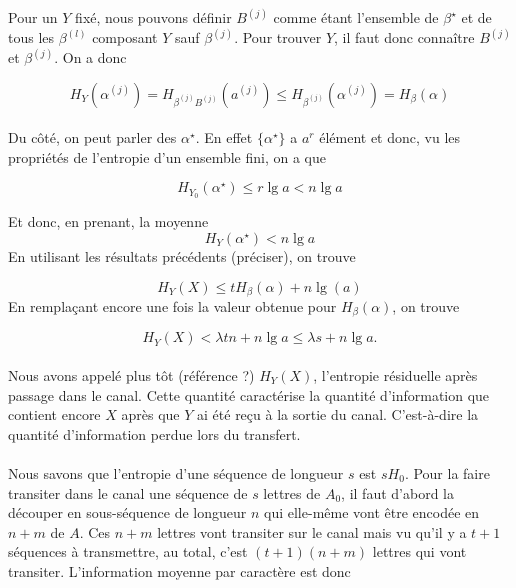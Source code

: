 	\paragraph{}
	Pour un $Y$ fixé, nous pouvons définir $B^{(j)}$ comme étant l'ensemble de $\beta^\star$ et de tous les $\beta^{(l)}$ composant $Y$ sauf $\beta^{(j)}$.
	Pour trouver $Y$, il faut donc connaître $B^{(j)}$ et $\beta^{(j)}$. On a donc
	
	\[H_Y(\alpha^{(j)}) = H_{\beta^{(j)}B^{(j)}}\left(a^{(j)}\right) \le H_{\beta^{(j)}}\left(\alpha^{(j)}\right)=H_\beta(\alpha) \]
	
	\paragraph{}
	Du côté, on peut parler des $\alpha^\star$. En effet $\{\alpha^\star\}$ a $a^r$ élément et donc, vu les propriétés de l'entropie d'un ensemble fini, on a que
	
	\[H_{Y_0}(\alpha^\star) \le r\lg a < n\lg a\]
	
	Et donc, en prenant, la moyenne 
	\[H_Y(\alpha^\star) < n \lg a\]
	En utilisant les résultats précédents (préciser), on trouve
	
	\[H_Y(X)\le t H_\beta(\alpha) + n \lg(a)\]
	En remplaçant encore une fois la valeur obtenue pour $H_\beta(\alpha)$, on trouve
	
	\[H_Y(X)<\lambda t n + n \lg a \le \lambda s+n \lg a.\]
	
	\paragraph{}
	Nous avons appelé plus tôt (référence ?) $H_Y(X)$, l'entropie résiduelle après passage dans le canal. Cette quantité caractérise la quantité d'information
	que contient encore $X$ après que $Y$ ai été reçu à la sortie du canal. C'est-à-dire la quantité d'information perdue lors du transfert.
	
	\paragraph{}
	Nous savons que l'entropie d'une séquence de longueur $s$ est $sH_0$. Pour la faire transiter dans le canal une séquence de $s$ lettres de $A_0$, il faut d'abord la découper en sous-séquence de 
	longueur $n$ qui elle-même vont être encodée en $n+m$ de $A$. Ces $n+m$ lettres vont transiter sur le canal mais vu qu'il y a $t+1$ séquences à transmettre,
	au total, c'est $(t+1)(n+m)$ lettres qui vont transiter. L'information moyenne par caractère est donc
	
